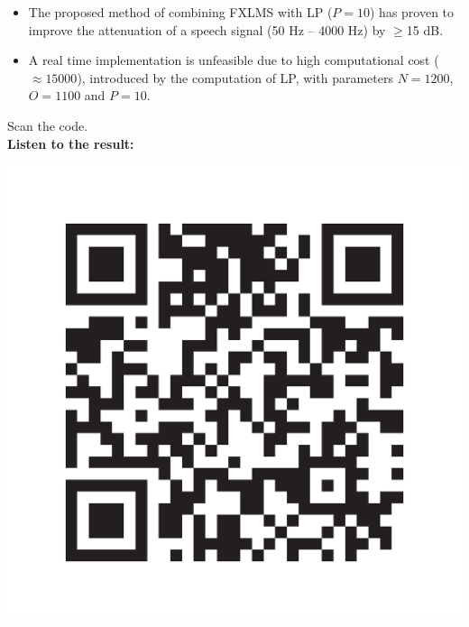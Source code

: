 \large
\begin{itemize}
	\item The proposed method of combining FXLMS with LP ($P=10$) has proven to improve the attenuation of a speech signal (50 Hz -- 4000 Hz) by  $\geq$15 dB. \\
	\item A real time implementation is unfeasible due to high computational cost ($\approx15000$), introduced by the computation of LP, with parameters $N=1200$, $O=1100$ and $P=10$. \\
\end{itemize}
\vspace{-5mm}
 \begin{minipage}{.8\columnwidth}
 	\begin{center}
	 	\textbf \large {{Scan the code.}}\\
	 	\textbf{Listen to the result:}
 	\end{center}
 \end{minipage}%
 \begin{minipage}{0.2\columnwidth}
 	\includegraphics[width=\textwidth]{figures/QRCODE.pdf}
 \end{minipage}